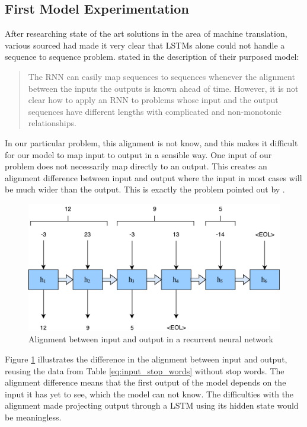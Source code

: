 \subsection{First Model Experimentation}
After researching state of the art solutions in the area of machine translation, various sourced had made it very clear that LSTMs alone could not handle a sequence to sequence problem. \citep{sutskever2014sequence} stated in the description of their purposed model:

\begin{quote}
    The RNN can easily map sequences to sequences whenever the alignment between the inputs the outputs is known ahead of time. However, it is not clear how to apply an RNN to problems whose input and the output sequences have different lengths with complicated and non-monotonic relationships.
\end{quote}

In our particular problem, this alignment is not know, and this makes it difficult for our model to map input to output in a sensible way. One input of our problem does not necessarily map directly to an output. This creates an alignment difference between input and output where the input in most cases will be much wider than the output. This is exactly the problem pointed out by \citep{sutskever2014sequence}.

\begin{figure}[H]
    \centering
    \includegraphics[width=1\textwidth]{fig/development_process/lstm-alignment.pdf}
    \caption{Alignment between input and output in a recurrent neural network}
    \label{fig:lstm-alignment}
\end{figure}

Figure \ref{fig:lstm-alignment} illustrates the difference in the alignment between input and output, reusing the data from Table \ref{eq:input_stop_words} without stop words. The alignment difference means that the first output of the model depends on the input it has yet to see, which the model can not know.  The difficulties with the alignment made projecting output through a LSTM using its hidden state would be meaningless. 

